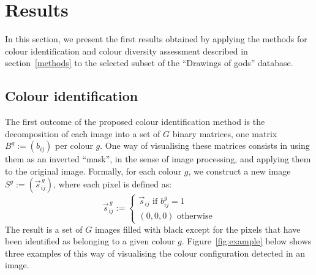 \documentclass[11pt,a4paper]{article}
\begin{document}

\section{Results}
\label{sec:results}

In this section, we present the first results obtained by applying the methods for colour identification and colour diversity assessment described in section~\ref{methods} to the selected subset of the ``Drawings of gods'' database.

\subsection{Colour identification}
\label{sec:results_identification}

The first outcome of the proposed colour identification method is the decomposition of each image into a set of $G$ binary matrices, one matrix $B^g := (b_{ij})$ per colour $g$. One way of visualising these matrices consists in using them as an inverted ``mask'', in the sense of image processing, and applying them to the original image. Formally, for each colour $g$, we construct a new image $S^g := (\vec{s}^{\,g}_{ij})$, where each pixel is defined as:
\begin{equation}
	\vec{s}^{\,g}_{ij} := 
	\begin{cases} 
		\vec{s}_{ij} \mbox{ if } b^g_{ij} = 1 \\
		(0, 0, 0) \mbox{ otherwise} 
	\end{cases}
\end{equation}
The result is a set of $G$ images filled with black except for the pixels that have been identified as belonging to a given colour $g$. Figure~\ref{fig:example} below shows three examples of this way of visualising the colour configuration detected in an image.
\end{document}

